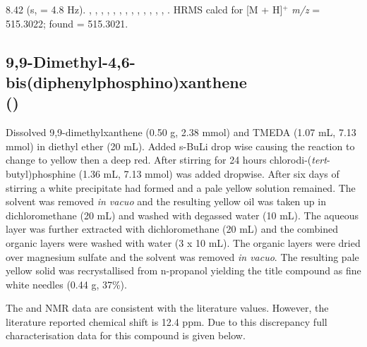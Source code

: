 8.42 (s,  = 4.8 Hz).
,
,
,
,
,
,
,
,
,
,
,
,
,
.
HRMS calcd for  [M + H]$^+$ \emph{m/z} = 515.3022; found = 515.3021.


\subsection*{9,9-Dimethyl-4,6-bis(diphenylphosphino)xanthene \\(\tBuxantphos)}


Dissolved 9,9-dimethylxanthene (0.50 g, 2.38 mmol) and \gls{TMEDA} (1.07 mL, 7.13 mmol) in diethyl ether (20 mL).  Added s-BuLi drop wise causing the reaction to change to yellow then a deep red.  After stirring for 24 hours chlorodi-(\emph{tert}-butyl)phosphine (1.36 mL, 7.13 mmol) was added dropwise.  After six days of stirring a white precipitate had formed and a pale yellow solution remained.  The solvent was removed \emph{in vacuo} and the resulting yellow oil was taken up in dichloromethane (20 mL) and washed with degassed water (10 mL).  The aqueous layer was further extracted with dichloromethane (20 mL) and the combined organic layers were washed with water (3 x 10 mL).  The organic layers were dried over magnesium sulfate and the solvent was removed \emph{in vacuo}.  The resulting pale yellow solid was recrystallised from n-propanol yielding the title compound as fine white needles (0.44 g, 37\%).

The \proton{} and \carbon{} NMR data are consistent with the literature values.\cite{Mispelaere2005}  However, the literature reported \phosphorus{} chemical shift is 12.4 ppm.  Due to this discrepancy full characterisation data for this compound is given below.


